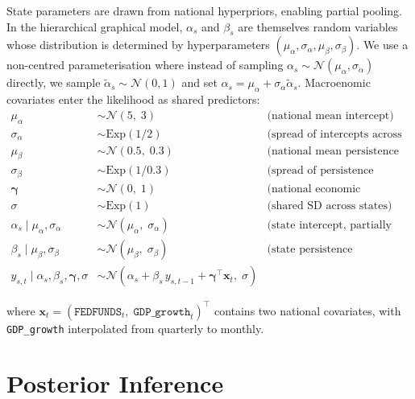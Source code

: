 \documentclass[10pt]{article}
\begin{document}
State parameters are drawn from national hyperpriors, enabling partial pooling.
In the hierarchical graphical model, $\alpha_s$ and $\beta_s$ are
themselves random variables whose distribution is determined by hyperparameters
$(\mu_\alpha,\sigma_\alpha,\mu_\beta,\sigma_\beta)$.
We use a non-centred parameterisation where instead of sampling
$\alpha_s \sim \mathcal{N}(\mu_\alpha,\sigma_\alpha)$ directly,
we sample $\tilde\alpha_s \sim \mathcal{N}(0,1)$ and set
$\alpha_s = \mu_\alpha + \sigma_\alpha\tilde\alpha_s$. Macroenomic covariates enter the
likelihood as shared predictors:
\begin{align*}
  \mu_\alpha &\sim \mathcal{N}(5,\; 3) 
    & \text{(national mean intercept)} \\
  \sigma_\alpha &\sim \mathrm{Exp}(1/2) 
    & \text{(spread of intercepts across states)} \\
  \mu_\beta &\sim \mathcal{N}(0.5,\; 0.3) 
    & \text{(national mean persistence coefficient)} \\
  \sigma_\beta &\sim \mathrm{Exp}(1/0.3) 
    & \text{(spread of persistence coefficients across states)} \\
  \boldsymbol{\gamma} &\sim \mathcal{N}(0,\; 1) 
    & \text{(national economic covariate coefficients)} \\
  \sigma &\sim \mathrm{Exp}(1) 
    & \text{(shared SD across states)} \\[6pt]
  \alpha_s \mid \mu_\alpha, \sigma_\alpha &\sim \mathcal{N}(\mu_\alpha,\; \sigma_\alpha)
    & \text{(state intercept, partially pooled)} \\
  \beta_s \mid \mu_\beta, \sigma_\beta &\sim \mathcal{N}(\mu_\beta,\; \sigma_\beta)
    & \text{(state persistence coefficient, partially pooled)} \\[6pt]
  y_{s,t} \mid \alpha_s, \beta_s, \boldsymbol{\gamma}, \sigma
    &\sim \mathcal{N}\!\left(
        \alpha_s + \beta_s\, y_{s,t-1} + \boldsymbol{\gamma}^\top \mathbf{x}_t,\;
        \sigma
      \right) 
\end{align*}

where $\mathbf{x}_t = (\texttt{FEDFUNDS}_t,\; \texttt{GDP\_growth}_t)^\top$
contains two national covariates, with
\texttt{GDP\_growth} interpolated from quarterly to monthly. \\ 

\section{Posterior Inference}
\end{document}
